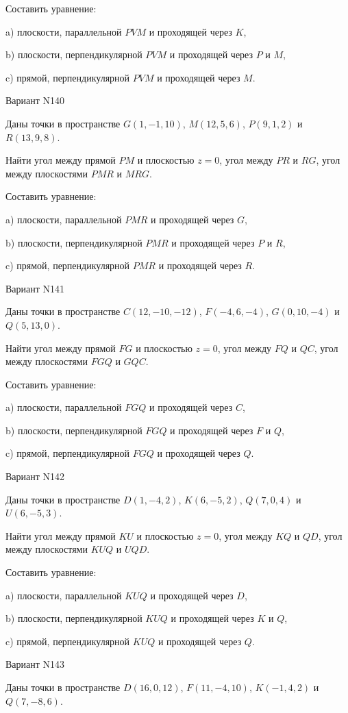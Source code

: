 \documentclass[11pt]{report}
\begin{document}
Составить уравнение: 

a) плоскости, параллельной $PVM$ и проходящей через $K$,

b) плоскости, перпендикулярной $PVM$ и проходящей через $P$ и $M$,

c) прямой, перпендикулярной $PVM$ и проходящей через $M$.

Вариант N140

Даны точки в пространстве
$G(1, -1, 10)$, $M(12, 5, 6)$, $P(9, 1, 2)$ и
$R(13, 9, 8)$.

Найти угол между прямой $PM$ и плоскостью $z = 0$, угол между $PR$ и $RG$, угол между плоскостями $PMR$ 
и $MRG$.

Составить уравнение: 

a) плоскости, параллельной $PMR$ и проходящей через $G$,

b) плоскости, перпендикулярной $PMR$ и проходящей через $P$ и $R$,

c) прямой, перпендикулярной $PMR$ и проходящей через $R$.

Вариант N141

Даны точки в пространстве
$C(12, -10, -12)$, $F(-4, 6, -4)$, $G(0, 10, -4)$ и
$Q(5, 13, 0)$.

Найти угол между прямой $FG$ и плоскостью $z = 0$, угол между $FQ$ и $QC$, угол между плоскостями $FGQ$ 
и $GQC$.

Составить уравнение: 

a) плоскости, параллельной $FGQ$ и проходящей через $C$,

b) плоскости, перпендикулярной $FGQ$ и проходящей через $F$ и $Q$,

c) прямой, перпендикулярной $FGQ$ и проходящей через $Q$.

Вариант N142

Даны точки в пространстве
$D(1, -4, 2)$, $K(6, -5, 2)$, $Q(7, 0, 4)$ и
$U(6, -5, 3)$.

Найти угол между прямой $KU$ и плоскостью $z = 0$, угол между $KQ$ и $QD$, угол между плоскостями $KUQ$ 
и $UQD$.

Составить уравнение: 

a) плоскости, параллельной $KUQ$ и проходящей через $D$,

b) плоскости, перпендикулярной $KUQ$ и проходящей через $K$ и $Q$,

c) прямой, перпендикулярной $KUQ$ и проходящей через $Q$.

Вариант N143

Даны точки в пространстве
$D(16, 0, 12)$, $F(11, -4, 10)$, $K(-1, 4, 2)$ и
$Q(7, -8, 6)$.
\end{document}
